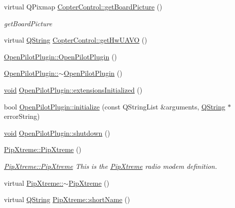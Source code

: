 \begin{DoxyCompactItemize}
virtual \-Q\-Pixmap \hyperlink{group___boards___open_pilot_plugin_ga06b9d173fe63133904394ae9f15d48ba}{\-Copter\-Control\-::get\-Board\-Picture} ()
\begin{DoxyCompactList}\small\item\em get\-Board\-Picture \end{DoxyCompactList}\item 
virtual \hyperlink{group___u_a_v_objects_plugin_gab9d252f49c333c94a72f97ce3105a32d}{\-Q\-String} \hyperlink{group___boards___open_pilot_plugin_ga844238f46b4df3aaf945874c9a6797ca}{\-Copter\-Control\-::get\-Hw\-U\-A\-V\-O} ()
\item 
\hyperlink{group___boards___open_pilot_plugin_ga3f890f5e776f6d5a0f6f23dd2d4976c9}{\-Open\-Pilot\-Plugin\-::\-Open\-Pilot\-Plugin} ()
\item 
\hyperlink{group___boards___open_pilot_plugin_gaa7eeef25853bb55d85427e94ceff9fa2}{\-Open\-Pilot\-Plugin\-::$\sim$\-Open\-Pilot\-Plugin} ()
\item 
\hyperlink{group___u_a_v_objects_plugin_ga444cf2ff3f0ecbe028adce838d373f5c}{void} \hyperlink{group___boards___open_pilot_plugin_gab3fcd8373403dc09fc4d868fdb8f5d23}{\-Open\-Pilot\-Plugin\-::extensions\-Initialized} ()
\item 
bool \hyperlink{group___boards___open_pilot_plugin_ga542bd2673508b0755f349632da3bd145}{\-Open\-Pilot\-Plugin\-::initialize} (const \-Q\-String\-List \&arguments, \hyperlink{group___u_a_v_objects_plugin_gab9d252f49c333c94a72f97ce3105a32d}{\-Q\-String} $\ast$error\-String)
\item 
\hyperlink{group___u_a_v_objects_plugin_ga444cf2ff3f0ecbe028adce838d373f5c}{void} \hyperlink{group___boards___open_pilot_plugin_gab41fd915d672acefc699cd2185ac1037}{\-Open\-Pilot\-Plugin\-::shutdown} ()
\item 
\hyperlink{group___boards___open_pilot_plugin_ga933d096d4ca64fb4d20fc5501d21fe24}{\-Pip\-Xtreme\-::\-Pip\-Xtreme} ()
\begin{DoxyCompactList}\small\item\em \hyperlink{group___boards___open_pilot_plugin_ga933d096d4ca64fb4d20fc5501d21fe24}{\-Pip\-Xtreme\-::\-Pip\-Xtreme} \-This is the \hyperlink{class_pip_xtreme}{\-Pip\-Xtreme} radio modem definition. \end{DoxyCompactList}\item 
virtual \hyperlink{group___boards___open_pilot_plugin_ga6a493453ee4e734933fca8caf5b92b7c}{\-Pip\-Xtreme\-::$\sim$\-Pip\-Xtreme} ()
\item 
virtual \hyperlink{group___u_a_v_objects_plugin_gab9d252f49c333c94a72f97ce3105a32d}{\-Q\-String} \hyperlink{group___boards___open_pilot_plugin_ga3267a634ade3947a6463a2aaae145c1b}{\-Pip\-Xtreme\-::short\-Name} ()

\end{DoxyCompactItemize}
